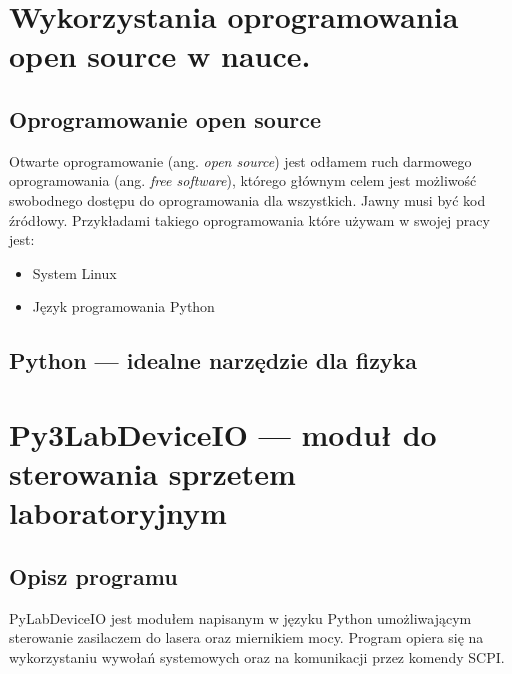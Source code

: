 \documentclass[a4paper, portrait,12pt]{mwrep}
\begin{document}
\newpage
\chapter{Wykorzystania oprogramowania open source w nauce.}
\section{Oprogramowanie open source}
Otwarte oprogramowanie (ang. \textit{open source}) jest odłamem ruch darmowego oprogramowania (ang. \textit{free software}), którego głównym celem jest możliwość swobodnego dostępu do oprogramowania dla wszystkich. Jawny musi być kod źródłowy. Przykładami takiego oprogramowania które używam w swojej pracy jest:
\begin{itemize}
\item System Linux
\item Język programowania Python
\end{itemize}
\section{Python --- idealne narzędzie dla fizyka}
\chapter{Py3LabDeviceIO --- moduł do sterowania sprzetem laboratoryjnym}
\section{Opisz programu}
PyLabDeviceIO jest modułem napisanym w języku Python umożliwającym sterowanie zasilaczem do lasera oraz miernikiem mocy. Program opiera się na wykorzystaniu wywołań systemowych oraz na komunikacji przez komendy SCPI. \\
\end{document}
